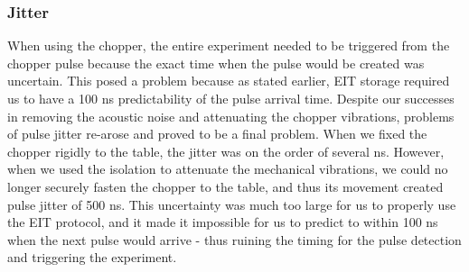 \subsubsection{Jitter}
\label{jitter} 

When using the chopper, the entire experiment needed to be triggered from the chopper pulse because the exact time when the pulse would be created was uncertain.  This posed a problem because as stated earlier, EIT storage required us to have a 100 ns predictability of the pulse arrival time.  Despite our successes in removing the acoustic noise and attenuating the chopper vibrations, problems of pulse jitter re-arose and proved to be a final problem.  When we fixed the chopper rigidly to the table, the jitter was on the order of several ns.  However, when we used the isolation to attenuate the mechanical vibrations, we could no longer securely fasten the chopper to the table, and thus its movement created pulse jitter of 500 ns.  This uncertainty was much too large for us to properly use the EIT protocol, and it made it impossible for us to predict to within 100 ns when the next pulse would arrive - thus ruining the timing for the pulse detection and triggering the experiment.  




